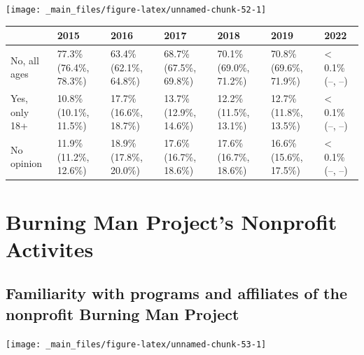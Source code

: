 \documentclass[
]{book}
\begin{document}
\texttt{[image: \_main\_files/figure-latex/unnamed-chunk-52-1]}

\begin{table}
\centering
\begin{tabular}[t]{>{}l|>{}l|>{}l|>{}l|>{}l|>{}l|>{}l}
\hline
  & 2015 & 2016 & 2017 & 2018 & 2019 & 2022\\
\hline
No, all ages & 77.3\% (76.4\%, 78.3\%) & 63.4\% (62.1\%, 64.8\%) & 68.7\% (67.5\%, 69.8\%) & 70.1\% (69.0\%, 71.2\%) & 70.8\% (69.6\%, 71.9\%) & < 0.1\% (--, --)\\
\hline
Yes, only 18+ & 10.8\% (10.1\%, 11.5\%) & 17.7\% (16.6\%, 18.7\%) & 13.7\% (12.9\%, 14.6\%) & 12.2\% (11.5\%, 13.1\%) & 12.7\% (11.8\%, 13.5\%) & < 0.1\% (--, --)\\
\hline
No opinion & 11.9\% (11.2\%, 12.6\%) & 18.9\% (17.8\%, 20.0\%) & 17.6\% (16.7\%, 18.6\%) & 17.6\% (16.7\%, 18.6\%) & 16.6\% (15.6\%, 17.5\%) & < 0.1\% (--, --)\\
\hline
\end{tabular}
\end{table}

\hypertarget{burning-man-projects-nonprofit-activites}{%
\section{Burning Man Project's Nonprofit Activites}\label{burning-man-projects-nonprofit-activites}}

\hypertarget{familiarity-with-programs-and-affiliates-of-the-nonprofit-burning-man-project}{%
\subsection{Familiarity with programs and affiliates of the nonprofit Burning Man Project}\label{familiarity-with-programs-and-affiliates-of-the-nonprofit-burning-man-project}}

\texttt{[image: \_main\_files/figure-latex/unnamed-chunk-53-1]}
\end{document}
